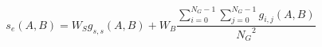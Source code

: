\begin{equation}
s_e(A,B) = W_S g_{s,s}(A,B) + W_B \frac{\sum_{i=0}^{N_G-1}\sum_{j=0}^{N_G-1} g_{i,j}(A,B)}{{N_G}^2}
\label{eq:song_distance_exhaustive}
\end{equation}
